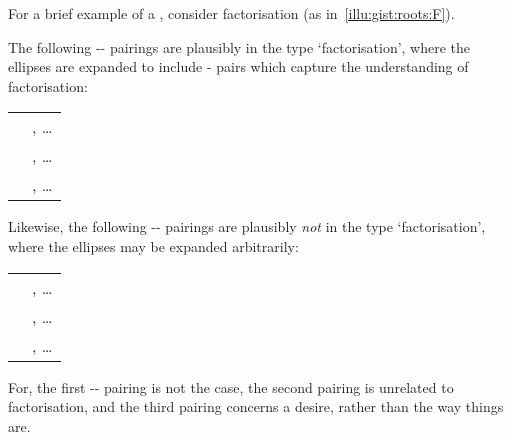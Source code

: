 \begin{note}
  For a brief example of a \torN{}, consider factorisation (as in~\autoref{illu:gist:roots:F}).

  The following \prop{}-\val{}-\pool{} pairings are plausibly in the type `factorisation', where the ellipses are expanded to include - pairs which capture the \agents{} understanding of factorisation:
  \begin{center}
    \begin{tabular}{R{.45\textwidth} L{.45\textwidth}}
       & , \dots \\
       & , \dots \\
       & , \dots \\
    \end{tabular}
  \end{center}
  Likewise, the following -\val{}-\pool{} pairings are plausibly \emph{not} in the type `factorisation', where the ellipses may be expanded arbitrarily:

  \begin{center}
    \begin{tabular}{R{.45\textwidth} L{.45\textwidth}}
       & , \dots \\
       & , \dots \\
       & , \dots \\
    \end{tabular}
  \end{center}

  \noindent%
  For, the first -- pairing is not the case, the second pairing is unrelated to factorisation, and the third pairing concerns a desire, rather than the way things are.
\end{note}


